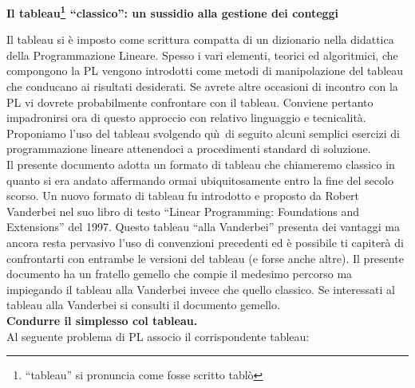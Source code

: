 \documentclass[10pt]{article}
\begin{document}
\begin{center}
   {\LARGE \bf Il tableau\footnote{``tableau'' si pronuncia come fosse scritto tabl\`o} ``classico'': un sussidio alla gestione dei conteggi}
\end{center}

Il tableau si \`e imposto come scrittura compatta di
un dizionario nella didattica della 
Programmazione Lineare.
Spesso i vari elementi,
teorici ed algoritmici,
che compongono la PL
vengono introdotti come metodi
di manipolazione del tableau che conducano
ai risultati desiderati.
Se avrete altre occasioni di incontro con la PL 
vi dovrete probabilmente confrontare
con il tableau.
Conviene pertanto impadronirsi ora di questo approccio
con relativo linguaggio e tecnicalit\`a.
Proponiamo l'uso del tableau
svolgendo qu\`\i\ di seguito alcuni
semplici esercizi di programmazione lineare attenendoci a procedimenti standard di soluzione.\\

Il presente documento adotta un formato di tableau che chiameremo classico
in quanto si era andato affermando ormai ubiquitosamente entro la fine del secolo scorso. Un nuovo formato di tableau fu introdotto e proposto da Robert Vanderbei nel suo libro di testo ``Linear Programming: Foundations and Extensions'' del 1997. Questo tableau ``alla Vanderbei'' presenta dei vantaggi ma ancora resta pervasivo l'uso di convenzioni precedenti ed \`e possibile ti capiter\`a di confrontarti con entrambe le versioni del tableau (e forse anche altre).
Il presente documento ha un fratello gemello che compie il medesimo percorso
ma impiegando il tableau alla Vanderbei invece che quello classico.
Se interessati al tableau alla Vanderbei si consulti il documento gemello.\\


\medskip
\noindent
{\large \bf Condurre il simplesso col tableau.}\\

Al seguente problema di PL associo il corrispondente tableau:
\end{document}
